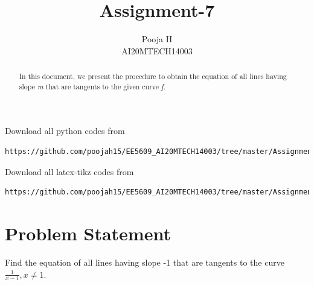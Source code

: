 \documentclass[journal,12pt,twocolumn]{IEEEtran}
\begin{document}
\let\vec\mathbf
\renewcommand{\thefigure}{\theproblem}
\def\putbox#1#2#3{\makebox[0in][l]{\makebox[#1][l]{}\raisebox{\baselineskip}[0in][0in]{\raisebox{#2}[0in][0in]{#3}}}}
     \def\rightbox#1{\makebox[0in][r]{#1}}
     \def\centbox#1{\makebox[0in]{#1}}
     \def\topbox#1{\raisebox{-\baselineskip}[0in][0in]{#1}}
     \def\midbox#1{\raisebox{-0.5\baselineskip}[0in][0in]{#1}}
\vspace{3cm}
\title{Assignment-7}
\author{Pooja H \\ AI20MTECH14003}
\maketitle
\newpage
\bigskip
\renewcommand{\thefigure}{\theenumi}
\renewcommand{\thetable}{\theenumi}
\begin{abstract}
In this document, we present the procedure to obtain the equation of all lines having slope \textsl{m} that are tangents to the given curve \textsl{f}.
\end{abstract}
Download all python codes from 
\begin{lstlisting}
https://github.com/poojah15/EE5609_AI20MTECH14003/tree/master/Assignment_7
\end{lstlisting}
Download all latex-tikz codes from 
\begin{lstlisting}
https://github.com/poojah15/EE5609_AI20MTECH14003/tree/master/Assignment_7
\end{lstlisting}


\section{Problem Statement}
Find the equation of all lines having slope -1 that are tangents to the curve $\frac{1}{x-1}, x \neq 1$.
\end{document}
